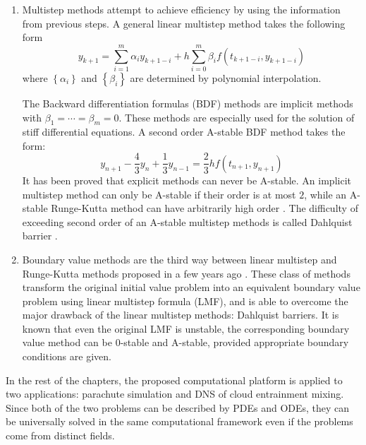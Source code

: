 \begin{enumerate}
\item Multistep methods \cite{Butcher2003Numerical} attempt to achieve efficiency by using the information from previous steps. A general linear multistep method takes the following form
\begin{equation}
y_{k+1}=\sum_{i=1}^{m}\alpha_{i}y_{k+1-i}+h\sum_{i=0}^{m}\beta_{i}f\left(t_{k+1-i},y_{k+1-i}\right)
\end{equation}
where $\left\{ \alpha_{i}\right\} $ and $\left\{ \beta_{i}\right\} $ are determined by polynomial interpolation.

The Backward differentiation formulas (BDF) methods are implicit methods with $\beta_1 = \cdots = \beta_m = 0$. These methods are especially used for the solution of stiff differential equations. A second order A-stable BDF method takes the form:
\begin{equation}
y_{n+1} - \frac{4}{3}y_{n} + \frac{1}{3}y_{n-1} = \frac{2}{3}hf(t_{n+1},y_{n+1})
\end{equation}
It has been proved that explicit methods can never be A-stable. An implicit multistep method can only be A-stable if their order is at most $2$, while an A-stable Runge-Kutta method can have arbitrarily high order \cite{Hairer1991Solving}. The difficulty of exceeding second order of an A-stable multistep methods is called Dahlquist barrier \cite{Dahlquist1963, Dahlquist1956}.

\item Boundary value methods are the third way between linear multistep and Runge-Kutta methods proposed in a few years ago \cite{Brugnano1998Boundary}. These class of methods transform the original initial value problem into an equivalent boundary value problem using linear multistep formula (LMF), and is able to overcome the major drawback of the linear multistep methods: Dahlquist barriers. It is known that even the original LMF is unstable, the corresponding boundary value method can be $0$-stable and A-stable, provided appropriate boundary conditions are given.
\end{enumerate}

In the rest of the chapters, the proposed computational platform is applied to two applications: parachute simulation and DNS of cloud entrainment mixing. Since both of the two problems can be described by PDEs and ODEs, they can be universally solved in the same computational framework even if the problems come from distinct fields.
